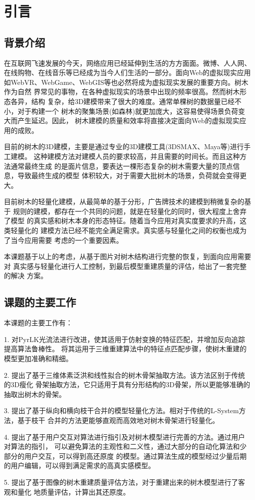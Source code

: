 



\chapter{引言}
\label{cha:intro}
\section{背景介绍}
\label{sec:background}
在互联网飞速发展的今天，网络应用已经延伸到生活的方方面面。微博、人人网、
在线购物、在线音乐等已经成为当今人们生活的一部分。面向Web的虚拟现实应用
如WebVR、WebGame、WebGIS等也必然将成为虚拟现实发展的重要方向。树木作为自然
界常见的事物，在各种虚拟现实的场景中出现的频率很高。然而树木形态各异，结构
复杂，给3D建模带来了很大的难度。通常单棵树的数据量已经不小，对于构建一个
树木的聚集场景(如森林)就更加庞大，这容易使得场景负荷变大而产生延迟。因此，
树木建模的质量和效率将直接决定面向Web的虚拟现实应用的成败。

目前的树木的3D建模，主要是通过专业的3D建模工具(3DSMAX、Maya等)进行手工建模。
这种建模方法对建模人员的要求较高，并且需要的时间长。而且这种方法通常最终生成
的是面片信息，要表达一棵形态复杂的树木需要大量的顶点信息，导致最终生成的模型
体积较大，对于需要大批树木的场景，负荷就会变得更大。

目前树木的轻量化建模，从最简单的基于分形，广告牌技术的建模到稍微复杂的基于
规则的建模，都存在一个共同的问题，就是在轻量化的同时，很大程度上舍弃了模型
的真实感和树木本身的形态特征。随着当今应用对真实度要求的升高，这类轻量化的
建模方法已经不能完全满足需求。真实感与轻量化之间的权衡也成为了当今应用需要
考虑的一个重要因素。

本课题基于以上的考虑，从基于图片对树木结构进行完整的恢复，到面向应用需要对
真实感与轻量化进行人工控制，到最后模型重建质量的评估，给出了一套完整的解决
方案。

\section{课题的主要工作}
\label{sec:objective}
本课题的主要工作有：

1. 对PyrLK光流法进行改进，使其适用于仿射变换的特征匹配，并增加反向追踪提高算法鲁棒性。
将其运用于三维重建算法中的特征点匹配步骤，使树木重建的模型更加准确和精细。

2. 提出了基于三维体素泛洪和线性拟合的树木骨架抽取方法。该方法区别于传统的3D瘦化
骨架抽取方法，它只适用于具有分形结构的3D骨架，所以更能够准确的抽取出树木的骨架。

3. 提出了基于纵向和横向枝干合并的模型轻量化方法。相对于传统的L-System方法，基于枝干
合并的方法更能够直观而高效地对树木骨架进行轻量化。

4. 提出了基于用户交互对算法进行指引及对树木模型进行完善的方法。通过用户对算法的指引，
可以避免算法的主观性和二义性，通过大部分的自动化算法和少部分的用户交互，可以得到高还原度
的模型。通过算法生成的模型经过少量后期的用户编辑，可以得到满足需求的高真实感模型。

5. 提出了基于图像的树木重建质量评估方法，对于重建出来的树木模型进行了客观和量化
地质量评估，计算出其还原度。
